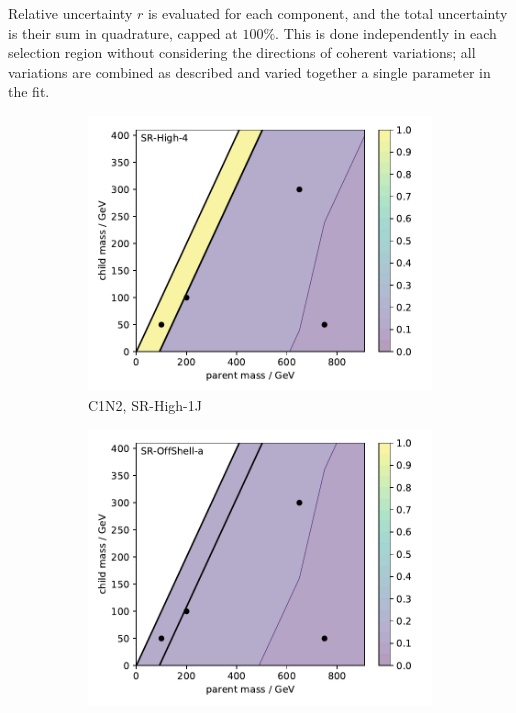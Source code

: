 Relative uncertainty $r$ is evaluated for each component, and the total
uncertainty is their sum in quadrature, capped at $100\%$.
This is done independently in each selection region without considering the
directions of coherent variations; all variations are combined as described
and varied together a single parameter in the fit.

\begin{figure}[tp]
\centering
\begin{subfigure}{0.48\textwidth}
\centering
\includegraphics[width=\textwidth]{figures/2ljets_signal_sys_c1n2_SRHigh4.pdf}
\caption{C1N2, SR-High-1J}
\end{subfigure}
\hfill
\begin{subfigure}{0.48\textwidth}
\centering
\includegraphics[width=\textwidth]{figures/2ljets_signal_sys_c1n2_SROffShell_1.pdf}

\end{subfigure}
\end{figure}
